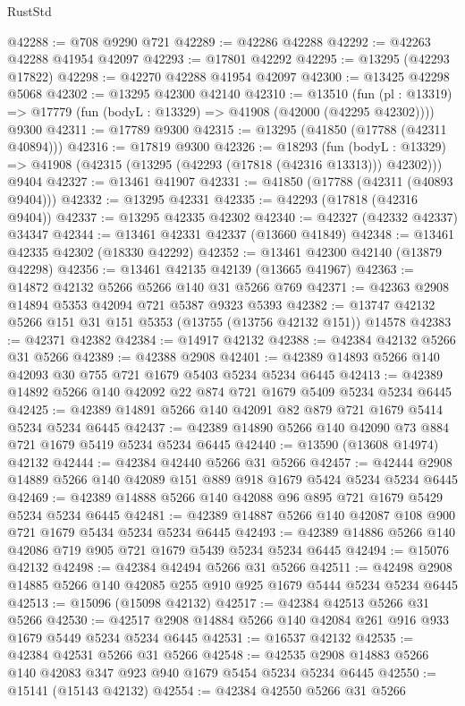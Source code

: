 \begin{lexlean}{RustStd}
\begin{coremodule}
@42288 := @708 @9290 @721
@42289 := @42286 @42288
@42292 := @42263 @42288 @41954 @42097
@42293 := @17801 @42292
@42295 := @13295 (@42293 @17822)
@42298 := @42270 @42288 @41954 @42097
@42300 := @13425 @42298 @5068
@42302 := @13295 @42300 @42140
@42310 := @13510
    (fun (pl : @13319) => @17779 (fun (bodyL : @13329) => @41908 (@42000 (@42295 @42302))))
    @9300
@42311 := @17789 @9300
@42315 := @13295 (@41850 (@17788 (@42311 @40894)))
@42316 := @17819 @9300
@42326 := @18293
    (fun (bodyL : @13329) => @41908 (@42315 (@13295 (@42293 (@17818 (@42316 @13313))) @42302)))
    @9404
@42327 := @13461 @41907
@42331 := @41850 (@17788 (@42311 (@40893 @9404)))
@42332 := @13295 @42331
@42335 := @42293 (@17818 (@42316 @9404))
@42337 := @13295 @42335 @42302
@42340 := @42327 (@42332 @42337) @34347
@42344 := @13461 @42331 @42337 (@13660 @41849)
@42348 := @13461 @42335 @42302 (@18330 @42292)
@42352 := @13461 @42300 @42140 (@13879 @42298)
@42356 := @13461 @42135 @42139 (@13665 @41967)
@42363 := @14872 @42132 @5266 @5266 @140 @31 @5266 @769
@42371 := @42363 @2908 @14894 @5353 @42094 @721 @5387 @9323 @5393
@42382 := @13747 @42132 @5266 @151 @31 @151 @5353 (@13755 (@13756 @42132 @151)) @14578
@42383 := @42371 @42382
@42384 := @14917 @42132
@42388 := @42384 @42132 @5266 @31 @5266
@42389 := @42388 @2908
@42401 := @42389 @14893 @5266 @140 @42093 @30 @755 @721 @1679 @5403 @5234 @5234 @6445
@42413 := @42389 @14892 @5266 @140 @42092 @22 @874 @721 @1679 @5409 @5234 @5234 @6445
@42425 := @42389 @14891 @5266 @140 @42091 @82 @879 @721 @1679 @5414 @5234 @5234 @6445
@42437 := @42389 @14890 @5266 @140 @42090 @73 @884 @721 @1679 @5419 @5234 @5234 @6445
@42440 := @13590 (@13608 @14974) @42132
@42444 := @42384 @42440 @5266 @31 @5266
@42457 := @42444 @2908 @14889 @5266 @140 @42089 @151 @889 @918 @1679 @5424 @5234 @5234 @6445
@42469 := @42389 @14888 @5266 @140 @42088 @96 @895 @721 @1679 @5429 @5234 @5234 @6445
@42481 := @42389 @14887 @5266 @140 @42087 @108 @900 @721 @1679 @5434 @5234 @5234 @6445
@42493 := @42389 @14886 @5266 @140 @42086 @719 @905 @721 @1679 @5439 @5234 @5234 @6445
@42494 := @15076 @42132
@42498 := @42384 @42494 @5266 @31 @5266
@42511 := @42498 @2908 @14885 @5266 @140 @42085 @255 @910 @925 @1679 @5444 @5234 @5234 @6445
@42513 := @15096 (@15098 @42132)
@42517 := @42384 @42513 @5266 @31 @5266
@42530 := @42517 @2908 @14884 @5266 @140 @42084 @261 @916 @933 @1679 @5449 @5234 @5234 @6445
@42531 := @16537 @42132
@42535 := @42384 @42531 @5266 @31 @5266
@42548 := @42535 @2908 @14883 @5266 @140 @42083 @347 @923 @940 @1679 @5454 @5234 @5234 @6445
@42550 := @15141 (@15143 @42132)
@42554 := @42384 @42550 @5266 @31 @5266

\end{coremodule}
\end{lexlean}
